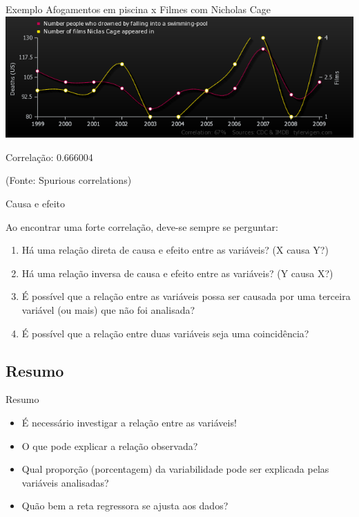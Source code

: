 \documentclass{beamer}
\begin{document}
\begin{frame}{Exemplo}
  Afogamentos em piscina x Filmes com Nicholas Cage
  \includegraphics[width=\textwidth]{Cap17/number-people-who-drowned-by-falling-into-a-swimming-pool_number-of-films-niclas-cage-appeared-in}

  Correlação: 0.666004

  (Fonte: Spurious correlations)
\end{frame}

\begin{frame}{Causa e efeito}

  Ao encontrar uma forte correlação, deve-se sempre se perguntar:

  \begin{enumerate}
  \item Há uma relação direta de causa e efeito entre as variáveis? (X
    causa Y?)

  \item Há uma relação inversa de causa e efeito entre as variáveis?
    (Y causa X?)

  \item É possível que a relação entre as variáveis possa ser causada
    por uma terceira variável (ou mais) que não foi analisada?

  \item É possível que a relação entre duas variáveis seja uma
    coincidência?
  \end{enumerate}
\end{frame}

\subsection{Resumo}

\begin{frame}{Resumo}
  \begin{itemize}
  \item É necessário investigar a relação entre as variáveis!
  \item O que pode explicar a relação observada?
  \item Qual proporção (porcentagem) da variabilidade pode ser
    explicada pelas variáveis analisadas?
  \item Quão bem a reta regressora se ajusta aos dados?
  \end{itemize}
\end{frame}
\end{document}
